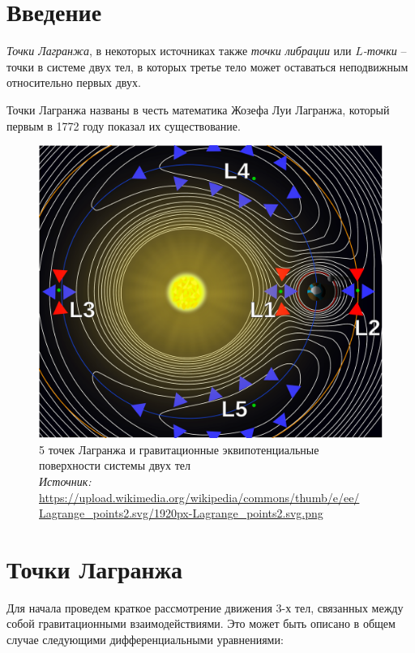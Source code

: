 \documentclass[12pt]{article}
\begin{document}
    \newpage

    \section{Введение}
    \par \textit{Точки Лагранжа}, в некоторых источниках также \textit{точки
    либрации} или \textit{$L$-точки} -- точки в системе двух тел, в которых
    третье тело может оставаться неподвижным относительно первых двух.
    \par Точки Лагранжа названы в честь математика Жозефа Луи Лагранжа,
    который первым в 1772 году показал их существование.

    \begin{figure}[H]
        \centering
        \includegraphics[scale=0.35]{Lagrange_points.pdf}
        \caption{5 точек Лагранжа и гравитационные эквипотенциальные
        поверхности системы двух тел\\
        \textit{Источник:}
        \url{https://upload.wikimedia.org/wikipedia/commons/thumb/e/ee/
        Lagrange_points2.svg/1920px-Lagrange_points2.svg.png}}
    \end{figure}

    \section{Точки Лагранжа}
    \par Для начала проведем краткое рассмотрение движения 3-х тел, связанных между
    собой гравитационными взаимодействиями. Это может быть описано в общем
    случае следующими дифференциальными уравнениями:
\end{document}
